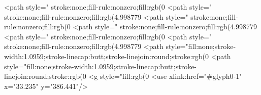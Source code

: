 <path style=" stroke:none;fill-rule:nonzero;fill:rgb(0%
<path style=" stroke:none;fill-rule:nonzero;fill:rgb(4.998779%
<path style=" stroke:none;fill-rule:nonzero;fill:rgb(0%
<path style=" stroke:none;fill-rule:nonzero;fill:rgb(4.998779%
<path style=" stroke:none;fill-rule:nonzero;fill:rgb(0%
<path style=" stroke:none;fill-rule:nonzero;fill:rgb(4.998779%
<path style="fill:none;stroke-width:1.0959;stroke-linecap:butt;stroke-linejoin:round;stroke:rgb(0%
<path style="fill:none;stroke-width:1.0959;stroke-linecap:butt;stroke-linejoin:round;stroke:rgb(0%
<g style="fill:rgb(0%
  <use xlink:href="#glyph0-1" x="33.235" y="386.441"/>

